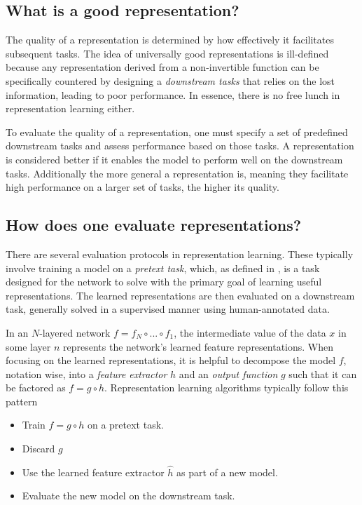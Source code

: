 \documentclass[../../thesis.tex]{subfiles}
\begin{document}
\subsection{What is a good representation?}

The quality of a representation is determined by how effectively it facilitates subsequent tasks. The idea of universally good representations is ill-defined because any representation derived from a non-invertible function can be specifically countered by designing a \textit{downstream tasks} that relies on the lost information, leading to poor performance. In essence, there is no free lunch in representation learning either.\newline

To evaluate the quality of a representation, one must specify a set of predefined downstream tasks and assess performance based on those tasks. A representation is considered better if it enables the model to perform well on the downstream tasks. Additionally the more general a representation is, meaning they facilitate high performance on a larger set of tasks, the higher its quality.

\subsection{How does one evaluate representations?}
There are several evaluation protocols in representation learning. These typically involve training a model on a \textit{pretext task}, which, as defined in \cite{jing2019selfsupervised}, is a task designed for the network to solve with the primary goal of learning useful representations. The learned representations are then evaluated on a downstream task, generally solved in a supervised manner using human-annotated data.\newline

In an $N$-layered network $f = f_N\circ ...\circ f_1$, the intermediate value of the data $x$ in some layer $n$ represents the network's learned feature representations. When focusing on the learned representations, it is helpful to decompose the model $f$, notation wise, into a \textit{feature extractor} $h$ and an \textit{output function} $g$ such that it can be factored as $f = g \circ h$. Representation learning algorithms typically follow this pattern
\begin{itemize}
    \item Train $f= g \circ h$ on a pretext task.
    \item Discard $g$
    \item Use the learned feature extractor $\widehat{h}$ as part of a new model.
    \item Evaluate the new model on the downstream task. 
\end{itemize}
\end{document}
